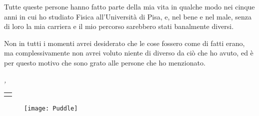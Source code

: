 Tutte queste persone hanno fatto parte della mia vita in qualche modo nei cinque anni in cui ho studiato Fisica all'Università di Pisa, e, nel bene e nel male, senza di loro la mia carriera e il mio percorso sarebbero stati banalmente diversi.

Non in tutti i momenti avrei desiderato che le cose fossero come di fatti erano, ma complessivamente non avrei voluto niente di diverso da ciò che ho avuto, ed è per questo motivo che sono grato alle persone che ho menzionato.

\bigskip
 
\noindent\textit{\myLocation, \MakeTextLowercase{\myTime}}

\smallskip
\vspace*{-20pt}

\begin{flushright}
	\begin{tabular}{m{5cm}}
		\\ \hline
		\centering\myName \\
	\end{tabular}
\end{flushright}

\pagebreak

\vfill

\begin{figure}
	\centering
	\texttt{[image: Puddle]}
\end{figure}

\vfill